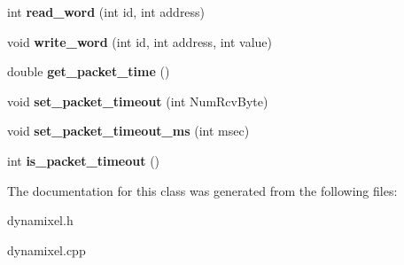 \begin{DoxyCompactItemize}
\item 
\hypertarget{classdynamixel_a45e99341e82c5114f6e829c9141bf96f}{}int {\bfseries read\+\_\+word} (int id, int address)\label{classdynamixel_a45e99341e82c5114f6e829c9141bf96f}

\item 
\hypertarget{classdynamixel_a925f62ce5e261e5ef4fe6dc46bdc7c63}{}void {\bfseries write\+\_\+word} (int id, int address, int value)\label{classdynamixel_a925f62ce5e261e5ef4fe6dc46bdc7c63}

\item 
\hypertarget{classdynamixel_a2fa5375537184c279a9ebfcfc0425071}{}double {\bfseries get\+\_\+packet\+\_\+time} ()\label{classdynamixel_a2fa5375537184c279a9ebfcfc0425071}

\item 
\hypertarget{classdynamixel_a067f82c21ed176e18fa224d16f3d1c5b}{}void {\bfseries set\+\_\+packet\+\_\+timeout} (int Num\+Rcv\+Byte)\label{classdynamixel_a067f82c21ed176e18fa224d16f3d1c5b}

\item 
\hypertarget{classdynamixel_a125b42f776c4aac520f274074f68b591}{}void {\bfseries set\+\_\+packet\+\_\+timeout\+\_\+ms} (int msec)\label{classdynamixel_a125b42f776c4aac520f274074f68b591}

\item 
\hypertarget{classdynamixel_afddd976dbc486cd08b92e0e6e4117519}{}int {\bfseries is\+\_\+packet\+\_\+timeout} ()\label{classdynamixel_afddd976dbc486cd08b92e0e6e4117519}

\end{DoxyCompactItemize}


The documentation for this class was generated from the following files\+:\begin{DoxyCompactItemize}
\item 
dynamixel.\+h\item 
dynamixel.\+cpp\end{DoxyCompactItemize}
